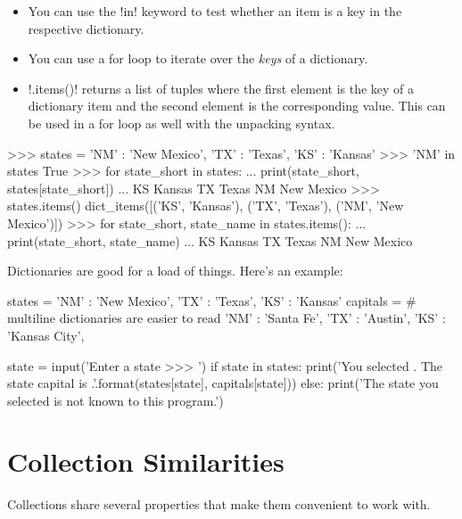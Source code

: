 \documentclass[11pt]{cselabheader}
\begin{document}
\begin{itemize}
  \item You can use the \pythoninline!in! keyword to test whether an item is a
    key in the respective dictionary.
  \item You can use a for loop to iterate over the \emph{keys} of a dictionary.
  \item \pythoninline!.items()! returns a list of tuples where the first element
    is the key of a dictionary item and the second element is the corresponding
    value. This can be used in a for loop as well with the unpacking syntax.
\end{itemize}

\begin{pyconcode}
>>> states = {'NM' : 'New Mexico', 'TX' : 'Texas', 'KS' : 'Kansas'}
>>> 'NM' in states
True
>>> for state_short in states:
...     print(state_short, states[state_short])
...
KS Kansas
TX Texas
NM New Mexico
>>> states.items()
dict_items([('KS', 'Kansas'), ('TX', 'Texas'), ('NM', 'New Mexico')])
>>> for state_short, state_name in states.items():
...     print(state_short, state_name)
...
KS Kansas
TX Texas
NM New Mexico
\end{pyconcode}

Dictionaries are good for a load of things. Here's an example:

\begin{python3code}
states = {'NM' : 'New Mexico', 'TX' : 'Texas', 'KS' : 'Kansas'}
capitals = { # multiline dictionaries are easier to read
  'NM' : 'Santa Fe',
  'TX' : 'Austin',
  'KS' : 'Kansas City',
}

state = input('Enter a state >>> ')
if state in states:
    print('You selected {}. The state capital is {}.'.format(states[state], 
        capitals[state]))
else:
    print('The state you selected is not known to this program.')
\end{python3code}

\pagebreak
\section{Collection Similarities}
Collections share several properties that make them convenient to work with.
\end{document}
